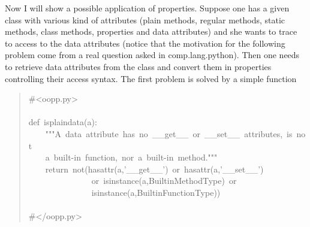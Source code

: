 \documentclass[10pt,english]{article}
\begin{document}
Now I will show a possible application of properties.
Suppose one has a given class with various kind of
attributes (plain methods, regular methods, static methods,
class methods, properties and data attributes) and she wants
to trace to access to the data attributes (notice that the motivation
for the following problem come from a real question asked in
comp.lang.python). Then one needs to retrieve data
attributes from the class and convert them in properties
controlling their access syntax. The first problem is solved
by a simple function
\begin{quote}
\begin{ttfamily}\begin{flushleft}
\mbox{{\#}<oopp.py>}\\
\mbox{}\\
\mbox{def~isplaindata(a):}\\
\mbox{~~~~"""A~data~attribute~has~no~{\_}{\_}get{\_}{\_}~or~{\_}{\_}set{\_}{\_}~attributes,~is~not}\\
\mbox{~~~~a~built-in~function,~nor~a~built-in~method."""~}\\
\mbox{~~~~return~not(hasattr(a,'{\_}{\_}get{\_}{\_}')~or~hasattr(a,'{\_}{\_}set{\_}{\_}')}\\
\mbox{~~~~~~~~~~~~~~~or~isinstance(a,BuiltinMethodType)~or}\\
\mbox{~~~~~~~~~~~~~~~isinstance(a,BuiltinFunctionType))}\\
\mbox{}\\
\mbox{{\#}</oopp.py>}
\end{flushleft}\end{ttfamily}
\end{quote}
\end{document}
